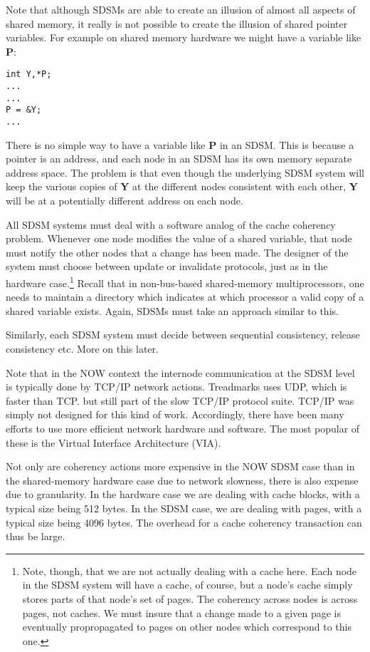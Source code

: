 Note that although SDSMs are able to create an illusion of almost all
aspects of shared memory, it really is not possible to create the
illusion of shared pointer variables.  For example on shared memory
hardware we might have a variable like {\bf P}:

\begin{Verbatim}[fontsize=\relsize{-2}]
int Y,*P;
...
...
P = &Y;
...
\end{Verbatim}

There is no simple way to have a variable like {\bf P} in an SDSM.
This is because a pointer is an address, and each node in an SDSM
has its own memory separate address space.  The problem is that even
though the underlying SDSM system will keep the various copies of {\bf Y}
at the different nodes consistent with each other, {\bf Y} will be at a
potentially different address on each node.

All SDSM systems must deal with a software analog of the cache coherency
problem.  Whenever one node modifies the value of a shared variable,
that node must notify the other nodes that a change has been made.  The
designer of the system must choose between update or invalidate
protocols, just as in the hardware case.\footnote{Note, though, that we
are not actually dealing with a cache here.  Each node in the SDSM
system will have a cache, of course, but a node's cache simply stores
parts of that node's set of pages.  The coherency across nodes is across
pages, not caches.  We must insure that a change made to a given page is
eventually propropagated to pages on other nodes which correspond to
this one.} Recall that in non-bus-based shared-memory multiprocessors,
one needs to maintain a directory which indicates at which processor a
valid copy of a shared variable exists.  Again, SDSMs must take an
approach similar to this.

Similarly, each SDSM system must decide between sequential
consistency, release consistency etc.  More on this later.

Note that in the NOW context the internode communication at the SDSM
level is typically done by TCP/IP network actions.  Treadmarks uses UDP,
which is faster than TCP. but still part of the slow TCP/IP protocol
suite.  TCP/IP was simply not designed for this kind of work.
Accordingly, there have been many efforts to use more efficient network
hardware and software.  The most popular of these is the Virtual
Interface Architecture (VIA).

Not only are coherency actions more expensive in the NOW SDSM case than in
the shared-memory hardware case due to network slowness, there is also
expense due to granularity.  In the hardware case we are dealing with
cache blocks, with a typical size being 512 bytes.  In the SDSM case, we
are dealing with pages, with a typical size being 4096 bytes.  The
overhead for a cache coherency transaction can thus be large.

